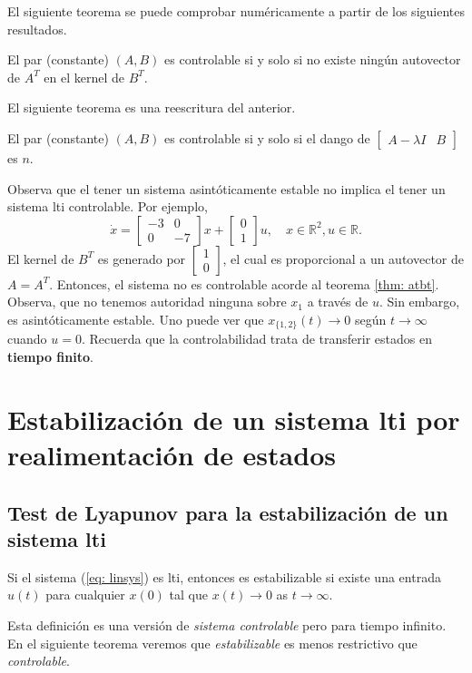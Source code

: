 El siguiente teorema se puede comprobar numéricamente a partir de los siguientes resultados.
\begin{theorem}
	\label{thm: atbt}
	El par (constante) $(A,B)$ es controlable si y solo si no existe ningún autovector de $A^T$ en el kernel de $B^T$.
\end{theorem}
El siguiente teorema es una reescritura del anterior.
\begin{theorem}
El par (constante) $(A,B)$ es controlable si y solo si el dango de $\begin{bmatrix}A-\lambda I & B\end{bmatrix}$ es $n$.
\end{theorem}

\begin{remark}
	Observa que el tener un sistema asintóticamente estable no implica el tener 
	un sistema lti controlable. Por ejemplo, 
\begin{equation}
	\dot x = \begin{bmatrix}-3 & 0 \\ 0 & -7\end{bmatrix}x + \begin{bmatrix}0 \\ 1\end{bmatrix}u, \quad x\in\mathbb{R}^2, u\in\mathbb{R}.
\end{equation}
	El kernel de $B^T$ es generado por $\begin{bmatrix}1 \\ 0\end{bmatrix}$, el cual es proporcional a un autovector de $A = A^T$. Entonces, el sistema no es controlable acorde al teorema \ref{thm: atbt}. Observa, que no tenemos autoridad ninguna sobre $x_1$ a través de $u$. Sin embargo, es asintóticamente estable. Uno puede ver que $x_{\{1,2\}}(t) \to 0$ según $t\to\infty$ cuando $u = 0$. Recuerda que la controlabilidad trata de transferir estados en \textbf{tiempo finito}.
\end{remark}

\section{Estabilización de un sistema lti por realimentación de estados}
\label{sec: reak}
\subsection{Test de Lyapunov para la estabilización de un sistema lti}
\begin{definition}
	Si el sistema (\ref{eq: linsys}) es lti, entonces es estabilizable si existe una entrada $u(t)$ para cualquier $x(0)$ tal que $x(t)\to 0$ as $t\to\infty$.
\end{definition}
Esta definición es una versión de \emph{sistema controlable} pero para tiempo infinito. En el siguiente teorema veremos que \emph{estabilizable} es menos restrictivo que \emph{controlable}.

